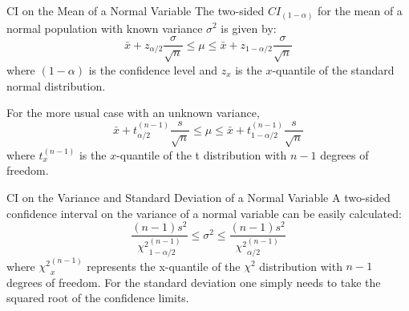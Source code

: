 

\begin{frame}{CI on the Mean of a Normal Variable}
The two-sided $CI_{(1-\alpha)}$ for the mean of a normal population with known variance $\sigma^2$ is given by:
\begin{equation*}
\bar{x}+z_{\alpha/2}\frac{\sigma}{\sqrt{n}}\leq\mu\leq\bar{x}+z_{1-\alpha/2}\frac{\sigma}{\sqrt{n}}
\end{equation*}
\noindent where $(1-\alpha)$ is the confidence level and $z_{x}$ is the $x$-quantile of the standard normal distribution.
\bigskip

For the more usual case with an unknown variance,
\begin{equation*}
\bar{x}+t_{\alpha/2}^{(n-1)}\frac{s}{\sqrt{n}}\leq\mu\leq\bar{x}+t_{1-\alpha/2}^{(n-1)}\frac{s}{\sqrt{n}}
\end{equation*}
\noindent where $t_{x}^{(n-1)}$ is the $x$-quantile of the t distribution with $n-1$ degrees of freedom.
\end{frame}


\begin{frame}{CI on the Variance and Standard Deviation of a Normal Variable}
A two-sided confidence interval on the variance of a normal variable can be easily calculated:
\begin{equation*}
\frac{(n-1)s^2}{{\chi^2}_{1 - \alpha/2}^{(n-1)}}\leq\sigma^2\leq\frac{(n-1)s^2}{{\chi^2}_{\alpha/2}^{(n-1)}}
\end{equation*}
\noindent where ${\chi^2}_{x}^{(n-1)}$ represents the x-quantile of the $\chi^2$ distribution with $n-1$ degrees of freedom. For the standard deviation one simply needs to take the squared root of the confidence limits.
\end{frame}


%

